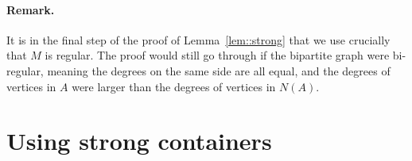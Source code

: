 \documentclass[12pt]{article}
\begin{document}
\paragraph{Remark.} It is in the final step of the proof of Lemma~\ref{lem::strong} that we use crucially that $M$ is regular. The proof would still go through if the bipartite graph were bi-regular, meaning the degrees on the same side are all equal, and the degrees of vertices in $A$ were larger than the degrees of vertices in $N(A)$.











\section{Using strong containers}\label{sec::use-containers}
\end{document}
